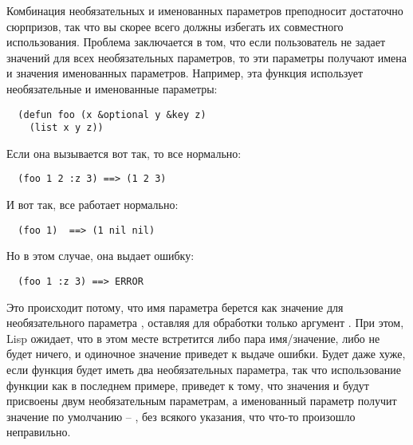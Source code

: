 Комбинация необязательных и именованных параметров преподносит достаточно сюрпризов, так
что вы скорее всего должны избегать их совместного использования.  Проблема заключается в
том, что если пользователь не задает значений для всех необязательных параметров, то эти
параметры получают имена и значения именованных параметров.  Например, эта функция
использует необязательные и именованные параметры:

\begin{lstlisting}
  (defun foo (x &optional y &key z) 
    (list x y z))
\end{lstlisting}

Если она вызывается вот так, то все нормально:

\begin{verbatim}
  (foo 1 2 :z 3) ==> (1 2 3)
\end{verbatim}

И вот так, все работает нормально:

\begin{verbatim}
  (foo 1)  ==> (1 nil nil)
\end{verbatim}

Но в этом случае, она выдает ошибку:

\begin{verbatim}
  (foo 1 :z 3) ==> ERROR
\end{verbatim}

Это происходит потому, что имя параметра  берется как значение для
необязательного параметра , оставляя для обработки только аргумент .  При
этом, Lisp ожидает, что в этом месте встретится либо пара имя/значение, либо не будет
ничего, и одиночное значение приведет к выдаче ошибки.  Будет даже хуже, если функция
будет иметь два необязательных параметра, так что использование функции как в последнем
примере, приведет к тому, что значения  и  будут присвоены двум
необязательным параметрам, а именованный параметр  получит значение по умолчанию
-- , без всякого указания, что что-то произошло неправильно.

